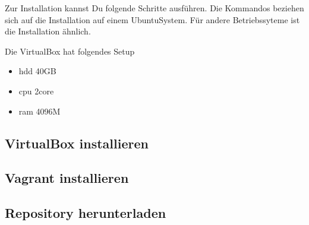 \documentclass[letterpaper,10pt,english]{sphinxmanual}
\begin{document}
\sphinxAtStartPar
Zur Installation kannst Du folgende Schritte ausführen. Die Kommandos
beziehen sich auf die Installation auf einem Ubuntu\sphinxhyphen{}System. Für andere
Betriebssyteme ist die Installation ähnlich.

\sphinxAtStartPar
Die VirtualBox hat folgendes Setup
\begin{itemize}
\item {} 
\sphinxAtStartPar
hdd 40GB

\item {} 
\sphinxAtStartPar
cpu 2core

\item {} 
\sphinxAtStartPar
ram 4096M

\end{itemize}


\subsection{VirtualBox installieren}
\label{\detokenize{toscience:virtualbox-installieren}}\label{\detokenize{toscience:id48}}
\begin{sphinxVerbatim}[commandchars=\\\{\}]
   
\end{sphinxVerbatim}


\subsection{Vagrant installieren}
\label{\detokenize{toscience:vagrant-installieren}}\label{\detokenize{toscience:id49}}
\begin{sphinxVerbatim}[commandchars=\\\{\}]
 
 
   
\end{sphinxVerbatim}


\subsection{Repository herunterladen}
\label{\detokenize{toscience:repository-herunterladen}}\label{\detokenize{toscience:id50}}
\begin{sphinxVerbatim}[commandchars=\\\{\}]
  
 
\end{sphinxVerbatim}
\end{document}
